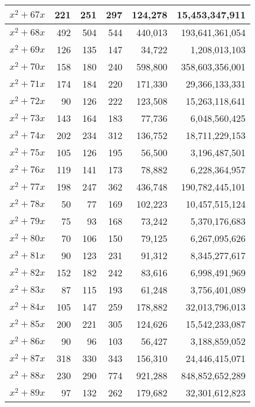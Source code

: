 \documentclass[a4paper]{amsproc}
\theoremstyle{plain}
\theoremstyle{named}
\begin{document}
\begin{longtable}{ | l | r | r | r | r | r | }
$x^2 + 67x$ & 221 & 251 & 297 & 124{,}278 & 15{,}453{,}347{,}911 \\ \hline
$x^2 + 68x$ & 492 & 504 & 544 & 440{,}013 & 193{,}641{,}361{,}054 \\ \hline
$x^2 + 69x$ & 126 & 135 & 147 & 34{,}722 & 1{,}208{,}013{,}103 \\ \hline
$x^2 + 70x$ & 158 & 180 & 240 & 598{,}800 & 358{,}603{,}356{,}001 \\ \hline
$x^2 + 71x$ & 174 & 184 & 220 & 171{,}330 & 29{,}366{,}133{,}331 \\ \hline
$x^2 + 72x$ & 90 & 126 & 222 & 123{,}508 & 15{,}263{,}118{,}641 \\ \hline
$x^2 + 73x$ & 143 & 164 & 183 & 77{,}736 & 6{,}048{,}560{,}425 \\ \hline
$x^2 + 74x$ & 202 & 234 & 312 & 136{,}752 & 18{,}711{,}229{,}153 \\ \hline
$x^2 + 75x$ & 105 & 126 & 195 & 56{,}500 & 3{,}196{,}487{,}501 \\ \hline
$x^2 + 76x$ & 119 & 141 & 173 & 78{,}882 & 6{,}228{,}364{,}957 \\ \hline
$x^2 + 77x$ & 198 & 247 & 362 & 436{,}748 & 190{,}782{,}445{,}101 \\ \hline
$x^2 + 78x$ & 50 & 77 & 169 & 102{,}223 & 10{,}457{,}515{,}124 \\ \hline
$x^2 + 79x$ & 75 & 93 & 168 & 73{,}242 & 5{,}370{,}176{,}683 \\ \hline
$x^2 + 80x$ & 70 & 106 & 150 & 79{,}125 & 6{,}267{,}095{,}626 \\ \hline
$x^2 + 81x$ & 90 & 123 & 231 & 91{,}312 & 8{,}345{,}277{,}617 \\ \hline
$x^2 + 82x$ & 152 & 182 & 242 & 83{,}616 & 6{,}998{,}491{,}969 \\ \hline
$x^2 + 83x$ & 87 & 115 & 193 & 61{,}248 & 3{,}756{,}401{,}089 \\ \hline
$x^2 + 84x$ & 105 & 147 & 259 & 178{,}882 & 32{,}013{,}796{,}013 \\ \hline
$x^2 + 85x$ & 200 & 221 & 305 & 124{,}626 & 15{,}542{,}233{,}087 \\ \hline
$x^2 + 86x$ & 90 & 96 & 103 & 56{,}427 & 3{,}188{,}859{,}052 \\ \hline
$x^2 + 87x$ & 318 & 330 & 343 & 156{,}310 & 24{,}446{,}415{,}071 \\ \hline
$x^2 + 88x$ & 230 & 290 & 774 & 921{,}288 & 848{,}852{,}652{,}289 \\ \hline
$x^2 + 89x$ & 97 & 132 & 262 & 179{,}682 & 32{,}301{,}612{,}823 \\ \hline

\end{longtable}
\end{document}
